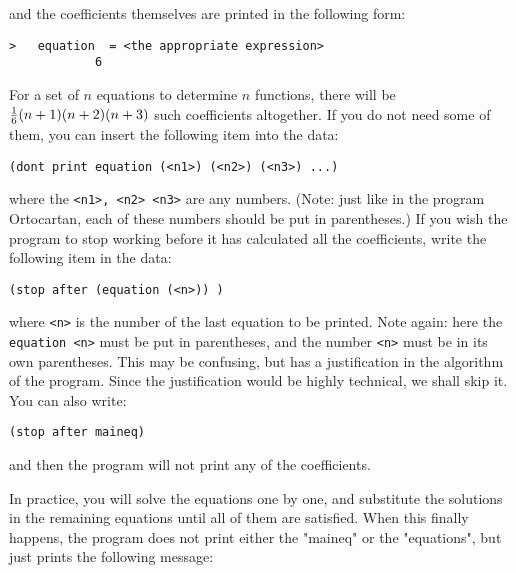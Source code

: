 \noindent and the coefficients themselves are printed in the following form:

\bigskip

\begin{verbatim}
>   equation  = <the appropriate expression>
            6
\end{verbatim}

\bigskip

\noindent For a set of $n$ equations to determine $n$ functions, there will be
${1 \over 6} (n + 1)(n + 2) (n + 3)$ such coefficients altogether. If you do
not need some of them, you can insert the following item into the data:

\bigskip

\begin{verbatim}
(dont print equation (<n1>) (<n2>) (<n3>) ...)
\end{verbatim}

\bigskip

\noindent where the \verb+<n1>, <n2> <n3>+ are any numbers. (Note: just like in
the program Ortocartan, each of these numbers should be put in parentheses.) If
you wish the program to stop working before it has calculated all the
coefficients, write the following item in the data:

\bigskip

\begin{verbatim}
(stop after (equation (<n>)) )
\end{verbatim}

\bigskip

\noindent where \verb+<n>+ is the number of the last equation to be printed.
Note again: here the \verb+equation <n>+ must be put in parentheses, and the
number \verb+<n>+ must be in its own parentheses. This may be confusing, but
has a justification in the algorithm of the program. Since the justification
would be highly technical, we shall skip it. You can also write:

\bigskip

\begin{verbatim}
(stop after maineq)
\end{verbatim}

\bigskip

\noindent and then the program will not print any of the coefficients.

In practice, you will solve the equations one by one, and substitute the
solutions in the remaining equations until all of them are satisfied. When this
finally happens, the program does not print either the "maineq" or the
"equations", but just prints the following message:

